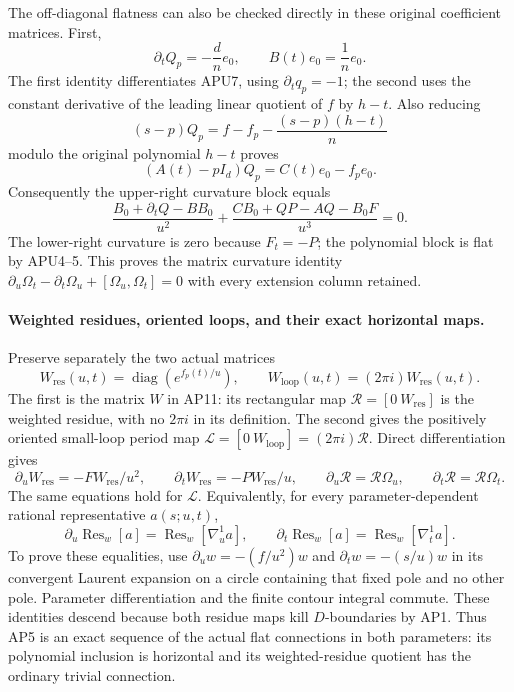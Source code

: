 The off-diagonal flatness can also be checked directly in these
original coefficient matrices.  First,
\[
 \partial_tQ_p=-\frac{d}{n}e_0,\qquad
 B(t)e_0=\frac1n e_0.
\]
The first identity differentiates APU7, using
\(\partial_tq_p=-1\); the second uses the constant derivative
of the leading linear quotient of \(f\) by \(h-t\).
Also reducing
\[
 (s-p)Q_p=f-f_p-\frac{(s-p)(h-t)}n
\]
modulo the original polynomial \(h-t\) proves
\[
 (A(t)-pI_d)Q_p=C(t)e_0-f_pe_0.
 \tag{APU10}
\]
Consequently the upper-right curvature block equals
\[
 \frac{B_0+\partial_tQ-BB_0}{u^2}
 +\frac{CB_0+QP-AQ-B_0F}{u^3}=0.
\]
The lower-right curvature is zero because \(F_t=-P\);
the polynomial block is flat by APU4--5.  This proves the matrix
curvature identity
\(\partial_u\Omega_t-\partial_t\Omega_u+
[\Omega_u,\Omega_t]=0\) with every extension column retained.

\paragraph{Weighted residues, oriented loops, and their exact horizontal maps.}
Preserve separately the two actual matrices
\[
 W_{\mathrm{res}}(u,t)=\operatorname{diag}(e^{f_p(t)/u}),\qquad
 W_{\mathrm{loop}}(u,t)=(2\pi i)W_{\mathrm{res}}(u,t).
 \tag{APU11}
\]
The first is the matrix \(W\) in AP11: its rectangular map
\(\mathcal R=[0\ W_{\mathrm{res}}]\) is the weighted residue,
with no \(2\pi i\) in its definition.  The second gives the
positively oriented small-loop period map
\(\mathcal L=[0\ W_{\mathrm{loop}}]=(2\pi i)\mathcal R\).
Direct differentiation gives
\[
 \partial_uW_{\mathrm{res}}=-FW_{\mathrm{res}}/u^2,\qquad
 \partial_tW_{\mathrm{res}}=-PW_{\mathrm{res}}/u,
 \qquad
 \partial_u\mathcal R=\mathcal R\Omega_u,\qquad
 \partial_t\mathcal R=\mathcal R\Omega_t .
 \tag{APU12}
\]
The same equations hold for \(\mathcal L\).
Equivalently, for every parameter-dependent rational representative
\(a(s;u,t)\),
\[
 \partial_u\operatorname{Res}_w[a]
       =\operatorname{Res}_w[\nabla_u^1a],\qquad
 \partial_t\operatorname{Res}_w[a]
       =\operatorname{Res}_w[\nabla_t^1a].
\]
To prove these equalities, use
\(\partial_uw=-(f/u^2)w\) and
\(\partial_tw=-(s/u)w\) in its convergent Laurent expansion
on a circle containing that fixed pole and no other pole.
Parameter differentiation and the finite contour integral commute.
These identities descend because both residue maps kill
\(D\)-boundaries by AP1.
Thus AP5 is an exact sequence of the actual flat connections in
both parameters: its polynomial inclusion is horizontal and its
weighted-residue quotient has the ordinary trivial connection.

